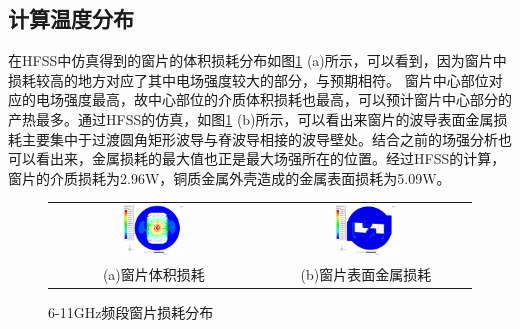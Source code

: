 \documentclass[master]{thesis-uestc}
\begin{document}
\subsection{计算温度分布}
在HFSS中仿真得到的窗片的体积损耗分布如图\ref{fig:X频段窗损耗分布图} (a)所示，可以看到，因为窗片中损耗较高的地方对应了其中电场强度较大的部分，与预期相符。
窗片中心部位对应的电场强度最高，故中心部位的介质体积损耗也最高，可以预计窗片中心部分的产热最多。通过HFSS的仿真，如图\ref{fig:X频段窗损耗分布图} (b)所示，可以看出来窗片的波导表面金属损耗主要集中于过渡圆角矩形波导与脊波导相接的波导壁处。结合之前的场强分析也可以看出来，金属损耗的最大值也正是最大场强所在的位置。经过HFSS的计算，窗片的介质损耗为2.96W，铜质金属外壳造成的金属表面损耗为5.09W。
\begin{figure}[!htb]
    \small
    \centering
    \begin{tabular}{@{\ }c@{\ }c}
        \includegraphics[width=0.3\textwidth]{pic/chapter3/X频段窗片体积损耗.png} & 
        \hspace{5pt}
        \includegraphics[width=0.3\textwidth]{pic/chapter3/X频段波导表面损耗.png}     \\
        \mbox{\small (a)窗片体积损耗}                                                                               & 
        \mbox{\small (b)窗片表面金属损耗}                                                                                  \\
    \end{tabular}
    \caption{6-11GHz频段窗片损耗分布}
    \label{fig:X频段窗损耗分布图}
\end{figure}
\end{document}
